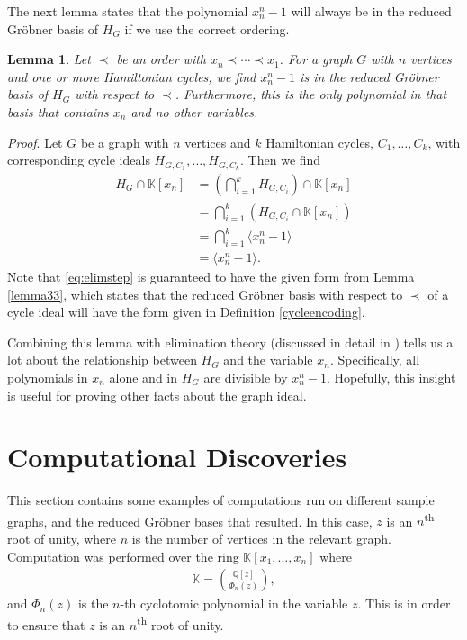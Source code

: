 \documentclass{amsart}
\newcommand{\Q}{\mathbb{Q}}
\renewcommand{\(}{\left(}
\renewcommand{\)}{\right)}
\newcommand{\<}{\langle}
\renewcommand{\>}{\rangle}
\renewcommand{\k}{\mathbb K}
\newcommand{\aln}[1]{\begin{align*} #1 \end{align*}} %
\newcommand{\fitp}[1]{\left( #1 \right)} %
\newtheorem{lemma}[theorem]{Lemma}
\theoremstyle{definition}
\theoremstyle{remark}
\begin{document}
The next lemma states that the polynomial $x_n^n - 1$ will always be in the reduced Gr\"obner basis of $H_G$ if we use the correct ordering.

\begin{lemma} \label{firstgen}
	Let $\prec$ be an order with $x_n \prec \cdots \prec x_1$. For a graph $G$ with $n$ vertices and one or more Hamiltonian cycles, we find $x_n^n - 1$ is in the reduced Gr\"obner basis of $H_G$ with respect to $\prec$. Furthermore, this is the only polynomial in that basis that contains $x_n$ and no other variables.
\end{lemma}
\emph{Proof}. Let $G$ be a graph with $n$ vertices and $k$ Hamiltonian cycles, $C_1,\ldots,C_k$, with corresponding cycle ideals $H_{G,C_1}, \ldots, H_{G,C_k}$. Then we find
\begin{align}
	H_G \cap \k[x_n] &= \(\bigcap_{i=1}^k H_{G,C_i}\) \cap \k[x_n]\\
	&= \bigcap_{i=1}^k (H_{G,C_i} \cap \k[x_n])\\
	&= \bigcap_{i=1}^k \langle x_n^n - 1 \rangle \label{eq:elimstep}\\
	&= \langle x_n^n - 1 \rangle.
\end{align}
Note that \eqref{eq:elimstep} is guaranteed to have the given form from Lemma \ref{lemma33}, which states that the reduced Gr\"obner basis with respect to $\prec$ of a cycle ideal will have the form given in Definition \ref{cycleencoding}.

Combining this lemma with elimination theory (discussed in detail in \cite{coxlittleoshea}) tells us a lot about the relationship between $H_G$ and the variable $x_n$. Specifically, all polynomials in $x_n$ alone and in $H_G$ are divisible by $x_n^n-1$. Hopefully, this insight is useful for proving other facts about the graph ideal.

\section{Computational Discoveries} \label{computation}

This section contains some examples of computations run on different sample graphs, and the reduced Gr\"obner bases that resulted. In this case, $z$ is an $n$\textsuperscript{th} root of unity, where $n$ is the number of vertices in the relevant graph. Computation was performed over the ring $\k[x_1,\ldots,x_n]$ where
\aln{
	\k = \fitp{\frac{\Q[z]}{\Phi_n(z)}},
}
and $\Phi_n(z)$ is the $n$-th cyclotomic polynomial in the variable $z$. This is in order to ensure that $z$ is an $n$\textsuperscript{th} root of unity.
\end{document}

